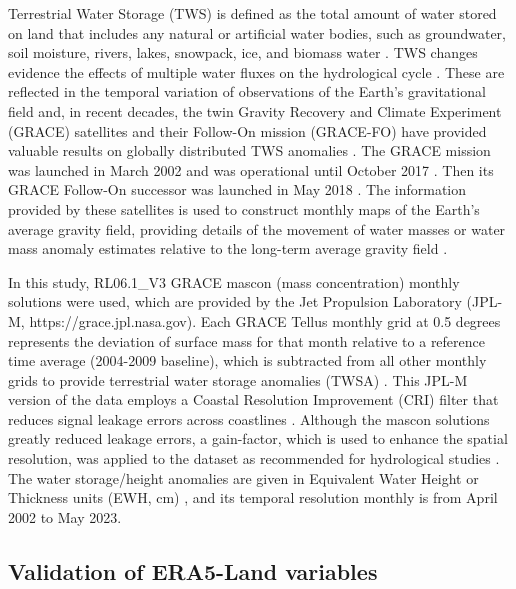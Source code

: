 \documentclass[
  number,
  preprint,
  3p]{elsarticle}
\begin{document}
Terrestrial Water Storage (TWS) is defined as the total amount of water
stored on land that includes any natural or artificial water bodies,
such as groundwater, soil moisture, rivers, lakes, snowpack, ice, and
biomass water \citep{Humphrey2023, Deng2023}. TWS changes evidence the
effects of multiple water fluxes on the hydrological cycle
\citep{Deng2023}. These are reflected in the temporal variation of
observations of the Earth's gravitational field
\citep{Abolafia2021, Sabzehee2023} and, in recent decades, the twin
Gravity Recovery and Climate Experiment (GRACE) satellites and their
Follow-On mission (GRACE-FO) have provided valuable results on globally
distributed TWS anomalies \citep{Tapley2019, Ferreira2023}. The GRACE
mission was launched in March 2002 and was operational until October
2017 \citep{Ramjeawon2022}. Then its GRACE Follow-On successor was
launched in May 2018 \citep{Landerer2020, Yin2022}. The information
provided by these satellites is used to construct monthly maps of the
Earth's average gravity field, providing details of the movement of
water masses or water mass anomaly estimates relative to the long-term
average gravity field \citep{Humphrey2023, Wahr2004}.

In this study, RL06.1\_V3 GRACE mascon (mass concentration) monthly
solutions were used, which are provided by the Jet Propulsion Laboratory
(JPL-M, https://grace.jpl.nasa.gov). Each GRACE Tellus monthly grid at
0.5 degrees represents the deviation of surface mass for that month
relative to a reference time average (2004-2009 baseline), which is
subtracted from all other monthly grids to provide terrestrial water
storage anomalies (TWSA) \citep{Ramjeawon2022, Yin2022}. This JPL-M
version of the data employs a Coastal Resolution Improvement (CRI)
filter that reduces signal leakage errors across coastlines
\citep{Wiese2019, Wiese2016}. Although the mascon solutions greatly
reduced leakage errors, a gain-factor, which is used to enhance the
spatial resolution, was applied to the dataset as recommended for
hydrological studies \citep{Ramjeawon2022, Yin2022}. The water
storage/height anomalies are given in Equivalent Water Height or
Thickness units (EWH, cm) \citep{Sabzehee2023}, and its temporal
resolution monthly is from April 2002 to May 2023.

\hypertarget{validation-of-era5-land-variables}{%
\subsection{Validation of ERA5-Land
variables}\label{validation-of-era5-land-variables}}
\end{document}
